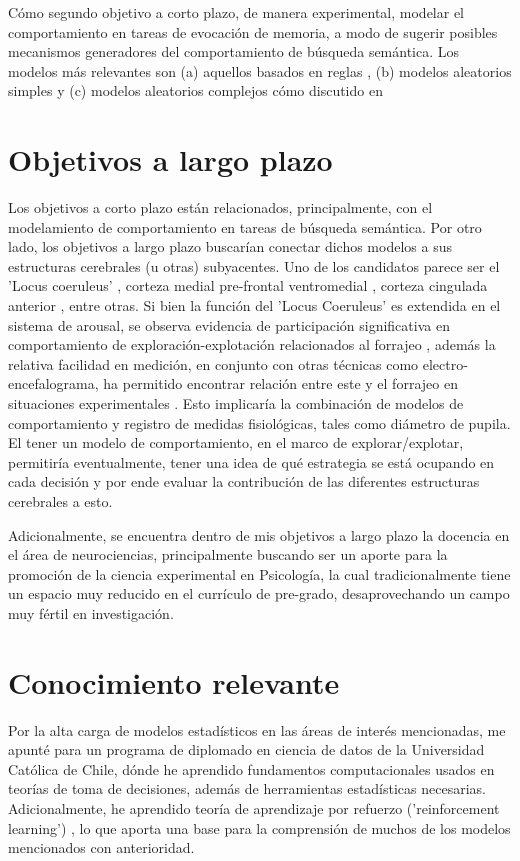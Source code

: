 \documentclass[11pt]{article}
\begin{document}
Cómo segundo objetivo a corto plazo, de manera experimental, modelar el
comportamiento en tareas de evocación de memoria, a modo de sugerir posibles
mecanismos generadores del comportamiento de búsqueda semántica. Los modelos más
relevantes son (a) aquellos basados en reglas
\citep{charnovOptimalForagingMarginal1976}, (b) modelos aleatorios simples
\citep{thompsonWalkingWikipediaScalefree2014} y (c) modelos aleatorios complejos
cómo discutido en \citep{benhamouHowManyAnimals2007}
\section*{Objetivos a largo plazo}
\label{sec:orgfd17f21}
Los objetivos a corto plazo están relacionados, principalmente, con el
modelamiento de comportamiento en tareas de búsqueda semántica. Por otro lado,
los objetivos a largo plazo buscarían conectar dichos modelos a sus estructuras
cerebrales (u otras) subyacentes. Uno de los candidatos parece ser el 'Locus
coeruleus' \citep{kaneIncreasedLocusCoeruleus2017}, corteza medial pre-frontal
ventromedial \citep{kollingNeuralMechanismsForaging2012}, corteza cingulada
anterior \citep{shenhavAnteriorCingulateEngagement2014}, entre otras. Si bien la
función del 'Locus Coeruleus' es extendida en el sistema de arousal, se observa
evidencia de participación significativa en comportamiento de
exploración-explotación relacionados al forrajeo
\citep{aston-jonesAdaptiveGainRole2005}, además la relativa facilidad en medición,
en conjunto con otras técnicas como electro-encefalograma, ha permitido
encontrar relación entre este y el forrajeo en situaciones experimentales
\citep{slanziCombiningEyeTracking2017}. Esto implicaría la combinación de modelos
de comportamiento y registro de medidas fisiológicas, tales como diámetro de
pupila. El tener un modelo de comportamiento, en el marco de explorar/explotar,
permitiría eventualmente, tener una idea de qué estrategia se está ocupando en
cada decisión y por ende evaluar la contribución de las diferentes estructuras
cerebrales a esto.

Adicionalmente, se encuentra dentro de mis objetivos a largo plazo la docencia
en el área de neurociencias, principalmente buscando ser un aporte para la
promoción de la ciencia experimental en Psicología, la cual tradicionalmente
tiene un espacio muy reducido en el currículo de pre-grado, desaprovechando un
campo muy fértil en investigación.
\section*{Conocimiento relevante}
\label{sec:org31a04c5}
Por la alta carga de modelos estadísticos en las áreas de interés mencionadas,
me apunté para un programa de diplomado en ciencia de datos de la Universidad
Católica de Chile, dónde he aprendido fundamentos computacionales usados en
teorías de toma de decisiones, además de herramientas estadísticas necesarias.
Adicionalmente, he aprendido teoría de aprendizaje por refuerzo
('reinforcement learning') \citep{suttonReinforcementLearningDirect1992}, lo que
aporta una base para la comprensión de muchos de los modelos mencionados con
anterioridad.
\end{document}
